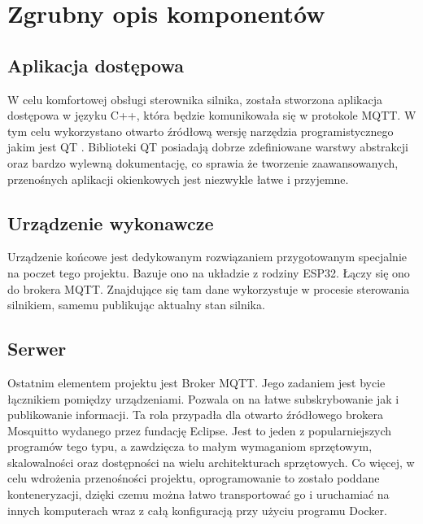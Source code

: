  

    \section{Zgrubny opis komponentów}

      \subsection{Aplikacja dostępowa}
        W celu komfortowej obsługi sterownika silnika, została stworzona aplikacja dostępowa w języku C++, która będzie komunikowała się w protokole MQTT.
        W tym celu wykorzystano otwarto źródłową wersję narzędzia programistycznego jakim jest QT \cite{qt}. Biblioteki QT posiadają dobrze zdefiniowane warstwy abstrakcji oraz bardzo wylewną dokumentację, co sprawia że tworzenie zaawansowanych, przenośnych aplikacji okienkowych jest niezwykle łatwe i przyjemne. 

      \subsection{Urządzenie wykonawcze}
        Urządzenie końcowe jest dedykowanym rozwiązaniem przygotowanym specjalnie na poczet tego projektu. Bazuje ono na układzie z rodziny ESP32. Łączy się ono do brokera MQTT. Znajdujące się tam dane wykorzystuje w procesie sterowania silnikiem, samemu publikując aktualny stan silnika. 


      \subsection{Serwer}
        Ostatnim elementem projektu jest Broker MQTT. Jego zadaniem jest bycie łącznikiem pomiędzy urządzeniami. Pozwala on na łatwe subskrybowanie jak i publikowanie informacji. Ta rola przypadła dla otwarto źródłowego brokera Mosquitto wydanego przez fundację Eclipse. Jest to jeden z popularniejszych programów tego typu, a zawdzięcza to małym wymaganiom sprzętowym, skalowalności oraz
        dostępności na wielu architekturach sprzętowych. Co więcej, w celu wdrożenia
        przenośności projektu, oprogramowanie to zostało poddane konteneryzacji,
        dzięki czemu można łatwo transportować go i uruchamiać na innych komputerach wraz z całą konfiguracją przy użyciu programu Docker.
